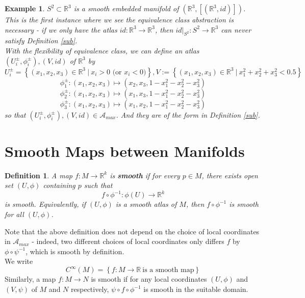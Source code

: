 \documentclass[11pt]{book}
\newtheorem{example}[theorem]{Example}
\newtheorem{definition}[theorem]{Definition}
\newcommand{\bb}[1]{\mathbb{#1}}
\newcommand{\mc}[1]{\mathcal{#1}}
\begin{document}
\begin{example}
$S^2 \subset \bb{R}^3$ is a smooth embedded manifold of $(\bb{R}^3, [(\bb{R}^3, id)])$.\\
This is the first instance where we see the equivalence class abstraction is necessary - if we only have the atlas $id:\bb{R}^3 \to \bb{R}^3$, then $id  \Big|_{S^2} : S^2 \to \bb{R}^3$ can never satisfy Definition \ref{sub}.\\
With the flexibility of equivalence class, we can define an atlas $(U_i^{\pm}, \phi_i^{\pm}), (V, id)$ of $\bb{R}^3$ by
$$U_i^{\pm} = \left\{ (x_1, x_2, x_3) \in \bb{R}^3\ \Big|\ x_i > 0 \text{ (or } x_i< 0) \right\}, V := \left\{ (x_1, x_2, x_3) \in \bb{R}^3\ \Big|\ x_1^2 + x_2^2 + x_3^2 < 0.5 \right\}$$
$$\phi_1^{\pm}: (x_1, x_2, x_3) \mapsto (x_2, x_3, 1-x_1^2-x_2^2-x_3^2)$$
$$\phi_2^{\pm}: (x_1, x_2, x_3) \mapsto (x_1, x_3, 1-x_1^2-x_2^2-x_3^2)$$
$$\phi_3^{\pm}: (x_1, x_2, x_3) \mapsto (x_1, x_2, 1-x_1^2-x_2^2-x_3^2)$$
so that $(U_i^{\pm}, \phi_i^{\pm}), (V, id) \in \mc{A}_{max}$. And they are of the form in Definition \ref{sub}.
\end{example}
\section{Smooth Maps between Manifolds}
\begin{definition}
A map $f: M \to \bb{R}^k$ is \textbf{smooth} if for every $p \in M$, there exists open set $(U,\phi)$ containing $p$ such that
$$f \circ \phi^{-1} : \phi(U) \to \bb{R}^k$$
is smooth. Equivalently, if $(U,\phi)$ is a smooth atlas of $M$, then $f \circ \phi^{-1}$ is smooth for all $(U, \phi)$.\\
\end{definition}
Note that the above definition does not depend on the choice of local coordinates in $\mc{A}_{max}$ - indeed, two different choices of local coordinates only differs $f$ by $\phi \circ \psi^{-1}$, which is smooth by definition.\\
We write
$$C^{\infty}(M) = \left\{ f: M \to \bb{R}\ \text{is a smooth map}\right\}$$
Similarly, a map $f: M \to N$ is smooth if for any local coordinates $(U,\phi)$ and $(V,\psi)$ of $M$ and $N$ respectively,
$\psi \circ f \circ \phi^{-1}$ is smooth in the suitable domain.
\end{document}
